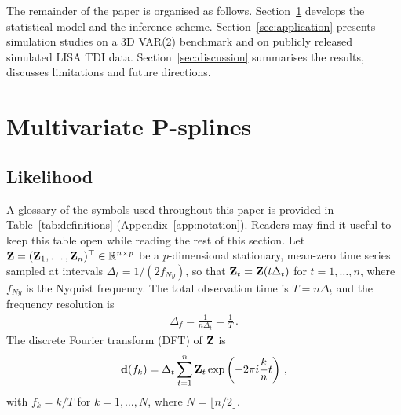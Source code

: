 \documentclass[%
	reprint,
	nofootinbib,
	amsmath,
	amssymb,
	aps,
]{revtex4-2}
\renewcommand{\d}{{\bf d}}
\newcommand{\Z}{{\bf Z}}
\begin{document}
    The remainder of the paper is organised as follows.
    Section~\ref{sec:psplines} develops the statistical model and the
    inference scheme. Section~\ref{sec:application} presents simulation
    studies on a 3D VAR(2) benchmark and on publicly released simulated LISA TDI data.
    Section~\ref{sec:discussion} summarises the results, discusses limitations
    and future directions.

	\section{Multivariate P-splines}\label{sec:psplines}

	\subsection{Likelihood}
	A glossary of the symbols used throughout this paper is provided in
	Table~\ref{tab:definitions} (Appendix~\ref{app:notation}). Readers
	may find it useful to keep this table open while reading the rest of
	this section. Let
	$\Z=(\Z_{1},\ldots,\Z_{n})^{\top}\in \mathbb{R}^{n\times p}$ be a
	$p$-dimensional stationary, mean-zero time series sampled at intervals
	$\Delta_{t}=1/(2f_{Ny})$, so that $\Z_{t}=\Z(t\Delta_{t})$ for
	$t=1,\ldots,n$, where $f_{Ny}$ is the Nyquist frequency. The total
	observation time is $T=n\Delta_{t}$ and the frequency resolution is
	\begin{align}
		\Delta_{f} = \frac{1}{n \Delta_{t}}= \frac{1}{T}\, .
	\end{align}
	The discrete Fourier transform (DFT) of $\Z$ is
	\begin{align}
		\d(f_{k}) = \Delta_{t}\sum_{t=1}^{n}\Z_{t}\exp \left(-2\pi i \frac{k}{n}t \right)\, ,
	\end{align}
	with $f_{k}=k/T$ for $k=1,\ldots,N$, where $N=\lfloor n/2\rfloor$.
\end{document}

